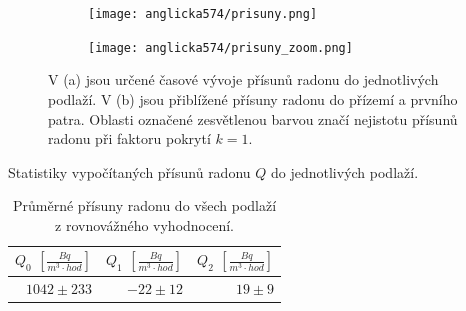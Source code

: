 \begin{figure}[ht]
    \begin{subfigure}{\textwidth}
        \centering
        \texttt{[image: anglicka574/prisuny.png]}
        \caption{}
        \label{fig:anglicka574_prisuny}
    \end{subfigure}
    \begin{subfigure}{\textwidth}
        \centering
        \texttt{[image: anglicka574/prisuny\_zoom.png]}
        \caption{}
        \label{fig:anglicka574_prisunyZoom}
    \end{subfigure}
    \caption{V (a) jsou určené časové vývoje přísunů radonu do jednotlivých podlaží. V (b) jsou přiblížené přísuny radonu do přízemí a prvního patra. Oblasti označené zesvětlenou barvou značí nejistotu přísunů radonu při faktoru pokrytí $k=1$.}
\end{figure}
\begin{table}[H]
    \centering
    \caption{Statistiky vypočítaných přísunů radonu $Q$ do jednotlivých podlaží.}
    \label{tab:anglicka574_prisuny}
    
\end{table}
\begin{table}[H]
    \centering
    \caption{Průměrné přísuny radonu do všech podlaží z rovnovážného vyhodnocení.}
    \label{tab:anglicka574_prisunyRovnovazne}
    \begin{tabular}{rrr}
        \toprule
        $Q_0$ $\left[\si{\frac{Bq}{m^3\cdot hod}}\right]$& $Q_1$ $\left[\si{\frac{Bq}{m^3\cdot hod}}\right]$ & $Q_2$ $\left[\si{\frac{Bq}{m^3\cdot hod}}\right]$\\
        \midrule
        $1042\pm233$ & $-22\pm12$ & $19\pm9$\\
        \bottomrule
    \end{tabular}
\end{table}
